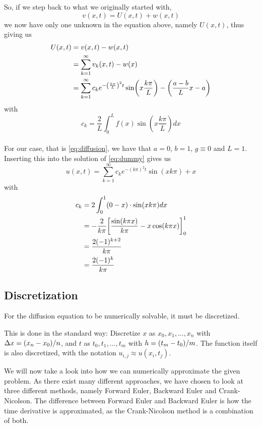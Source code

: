 \documentclass[12pt,english,a4paper]{article}
\begin{document}
So, if we step back to what we originally started with,
\[
v(x,t) = U(x,t) + w(x,t)
\]
we now have only one unknown in the equation above, namely \(U(x,t)\), thus giving us
\begin{align*}
 U(x,t) &= v(x,t)- w(x,t) \\
 &=  \sum_{k=1}^\infty v_k(x,t) - w(x) \\
 &=\sum_{k=1}^\infty c_ke^{-\qty(\frac{k \pi}{L})^2t}\sin(x\frac{k \pi}{L})  -\qty(\frac{a-b}{L}x - a)
\end{align*}
with
\[
c_k = \frac{2}{L}\int_0^Lf(x)\sin(x\frac{k \pi}{L})dx
\]
\hfill \\
For our case, that is \vref{eq:diffusion}, we have that \(a = 0\), \(b = 1\), \(g \equiv 0\) and \(L = 1\). Inserting this into the solution of \vref{eq:dummy} gives us
\begin{equation}\label{eq:analyticalSolution}
	u(x,t) = \sum_{k=1}^\infty c_ke^{-(k\pi)^2t}\sin(xk\pi)  + x
\end{equation}
with
\begin{align*}
c_k &= 2\int_0^1(0-x)\cdot\sin(xk\pi)dx \\
&= - \frac{2}{k\pi}\qty[\frac{\sin(k\pi x)}{k\pi} - x\cos(k\pi x)]_0^1 \\
&= \frac{2(-1)^{k+2}}{k\pi} \\
&=  \frac{2(-1)^k}{k\pi}
\end{align*}

\subsection{Discretization}


For the diffusion equation to be numerically solvable, it must be discretized.

This is done in the standard way: Discretize \(x\) as \(x_0,x_1,\dots,x_n\) with \(\Delta x=\qty(x_n-x_0)/n\), and \(t\) as \(t_0,t_1,\dots,t_m\) with \(h = \qty(t_m-t_0)/m\). The function itself is also discretized, with the notation \(u_{i,j} \approx u(x_i,t_j)\).

We will now take a look into how we can numerically approximate the given problem. As there exist many different approaches, we have chosen to look at three different methods, namely Forward Euler, Backward Euler and Crank-Nicolson. The difference between Forward Euler and Backward Euler is how the time derivative is approximated, as the Crank-Nicolson method is a combination of both.
%
\end{document}
